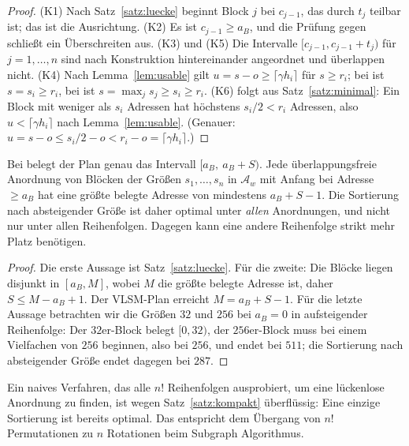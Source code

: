 \begin{proof}
	(K1) Nach Satz~\ref{satz:luecke} beginnt Block $j$ bei $c_{j-1}$, das durch $t_j$ teilbar ist; das ist die Ausrichtung. (K2) Es ist $c_{j-1} \ge a_B$, und die Prüfung gegen  schließt ein Überschreiten aus. (K3) und (K5) Die Intervalle $[c_{j-1}, c_{j-1}+t_j)$ für $j=1,\ldots,n$ sind nach Konstruktion hintereinander angeordnet und überlappen nicht. (K4) Nach Lemma~\ref{lem:usable} gilt $u = s - o \ge \lceil\gamma h_i\rceil$ für $s \ge r_i$; bei  ist $s = s_i \ge r_i$, bei  ist $s = \max_j s_j \ge s_i \ge r_i$. (K6) folgt aus Satz~\ref{satz:minimal}: Ein Block mit weniger als $s_i$ Adressen hat höchstens $s_i/2 < r_i$ Adressen, also $u < \lceil\gamma h_i\rceil$ nach Lemma~\ref{lem:usable}. (Genauer: $u = s - o \le s_i/2 - o < r_i - o = \lceil\gamma h_i\rceil$.)
\end{proof}

\begin{satz}
\label{satz:kompakt}
	Bei  belegt der Plan genau das Intervall $[a_B,\ a_B+S)$. Jede überlappungsfreie Anordnung von Blöcken der Größen $s_1,\ldots,s_n$ in $\mathcal{A}_w$ mit Anfang bei Adresse $\ge a_B$ hat eine größte belegte Adresse von mindestens $a_B + S - 1$. Die Sortierung nach absteigender Größe ist daher optimal unter \emph{allen} Anordnungen, und nicht nur unter allen Reihenfolgen. Dagegen kann eine andere Reihenfolge strikt mehr Platz benötigen.
\end{satz}

\begin{proof}
	Die erste Aussage ist Satz~\ref{satz:luecke}. Für die zweite: Die Blöcke liegen disjunkt in $[a_B, M]$, wobei $M$ die größte belegte Adresse ist, daher $S \le M - a_B + 1$. Der VLSM-Plan erreicht $M = a_B+S-1$. Für die letzte Aussage betrachten wir die Größen $32$ und $256$ bei $a_B = 0$ in aufsteigender Reihenfolge: Der $32$er-Block belegt $[0,32)$, der $256$er-Block muss bei einem Vielfachen von $256$ beginnen, also bei $256$, und endet bei $511$; die Sortierung nach absteigender Größe endet dagegen bei $287$.
\end{proof}

\begin{bemerkung}
	Ein naives Verfahren, das alle $n!$ Reihenfolgen ausprobiert, um eine lückenlose Anordnung zu finden, ist wegen Satz~\ref{satz:kompakt} überflüssig: Eine einzige Sortierung ist bereits optimal. Das entspricht dem Übergang von $n!$ Permutationen zu $n$ Rotationen beim Subgraph Algorithmus.
\end{bemerkung}

